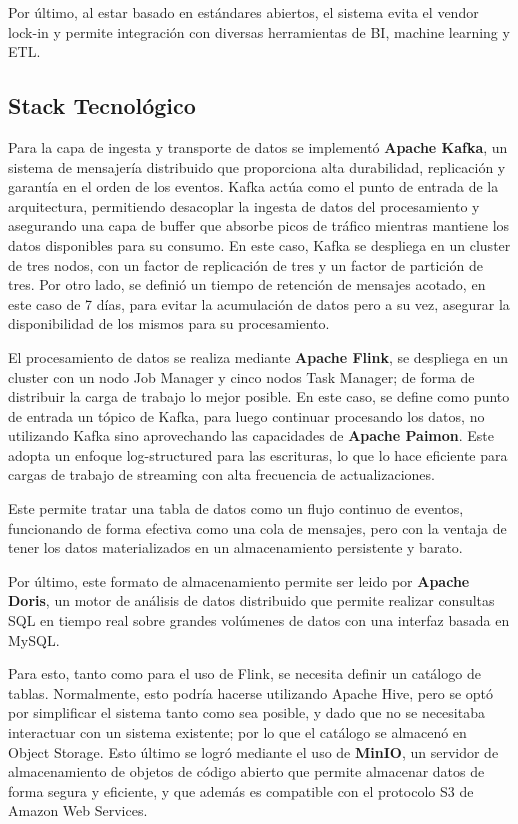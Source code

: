 Por último, al estar basado en estándares abiertos, el sistema evita el vendor lock-in 
y permite integración con diversas herramientas de BI, machine learning y ETL.

\newpage
\subsection{Stack Tecnológico}
Para la capa de ingesta y transporte de datos se implementó \textbf{Apache Kafka}, 
un sistema de mensajería distribuido que proporciona alta durabilidad, replicación y garantía en el orden de los eventos. 
Kafka actúa como el punto de entrada de la arquitectura, permitiendo desacoplar la ingesta de datos del procesamiento 
y asegurando una capa de buffer que absorbe picos de tráfico mientras mantiene los datos disponibles para su consumo.
En este caso, Kafka se despliega en un cluster de tres nodos, con un factor de replicación de tres y un factor de partición de tres.
Por otro lado, se definió un tiempo de retención de mensajes acotado, en este caso de 7 días, para evitar la acumulación de datos
pero a su vez, asegurar la disponibilidad de los mismos para su procesamiento.\newline

El procesamiento de datos se realiza mediante \textbf{Apache Flink}, se despliega en un cluster con un nodo Job Manager 
y cinco nodos Task Manager; de forma de distribuir la carga de trabajo lo mejor posible.
En este caso, se define como punto de entrada un tópico de Kafka, para luego continuar procesando los datos, 
no utilizando Kafka sino aprovechando las capacidades de \textbf{Apache Paimon}. 
Este adopta un enfoque log-structured para las escrituras, 
lo que lo hace eficiente para cargas de trabajo de streaming con alta frecuencia de actualizaciones.\newline

Este permite tratar una tabla de datos como un flujo continuo de eventos, funcionando de forma efectiva como 
una cola de mensajes, pero con la ventaja de tener los datos materializados en un almacenamiento persistente y barato.\newline

Por último, este formato de almacenamiento permite ser leido por \textbf{Apache Doris}, un motor de análisis de datos
distribuido que permite realizar consultas SQL en tiempo real sobre grandes volúmenes de datos con una interfaz basada en MySQL.\newline

Para esto, tanto como para el uso de Flink, se necesita definir un catálogo de tablas.
Normalmente, esto podría hacerse utilizando Apache Hive, pero se optó por simplificar el sistema tanto como sea posible, 
y dado que no se necesitaba interactuar con un sistema existente; por lo que el catálogo se almacenó en Object Storage.\newline
\newpage
Esto último se logró mediante el uso de \textbf{MinIO}, un servidor de almacenamiento de objetos de código abierto que
permite almacenar datos de forma segura y eficiente, y que además es compatible con el protocolo S3 de Amazon Web Services.\newline

